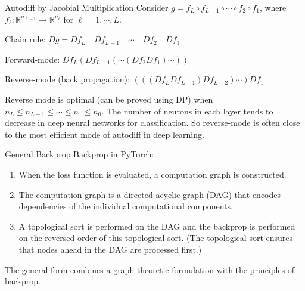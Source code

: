 \begin{frame}[allowframebreaks]

\begin{myconceptblock}{6.38}{Autodiff by Jacobial Multiplication}
    Consider $g=f_{L} \circ f_{L-1} \circ \cdots \circ f_{2} \circ f_{1}$, where $f_{\ell}: \mathbb{R}^{n_{\ell-1}} \rightarrow \mathbb{R}^{n_{\ell}}$ for $\ell=1, \cdots, L$.

    Chain rule: $D g=D f_{L} \quad D f_{L-1} \quad \cdots \quad D f_{2} \quad D f_{1}$

    Forward-mode: $D f_{L}\left(D f_{L-1}\left(\cdots\left(D f_{2} D f_{1}\right) \cdots\right)\right)$

    Reverse-mode (back propagation): $\left(\left(\left(D f_{L} D f_{L-1}\right) D f_{L-2}\right) \cdots\right) D f_{1}$

    Reverse mode is optimal (can be proved using DP) when $n_{L} \leq n_{L-1} \leq \cdots \leq n_{1} \leq n_{0}$. The number of neurons in each layer tends to decrease in deep neural networks for classification. So reverse-mode is often close to the most efficient mode of autodiff in deep learning.
\end{myconceptblock}

\end{frame}

\begin{frame}[allowframebreaks]

\begin{mydefinitionblock}{6.39}{General Backprop}
    Backprop in PyTorch:

    \begin{enumerate}
        \item When the loss function is evaluated, a computation graph is constructed.
        \item The computation graph is a directed acyclic graph (DAG) that encodes dependencies of the individual computational components.
        \item A topological sort is performed on the DAG and the backprop is performed on the reversed order of this topological sort. (The topological sort ensures that nodes ahead in the DAG are processed first.)
    \end{enumerate}

    The general form combines a graph theoretic formulation with the principles of backprop.
\end{mydefinitionblock}

\end{frame}

